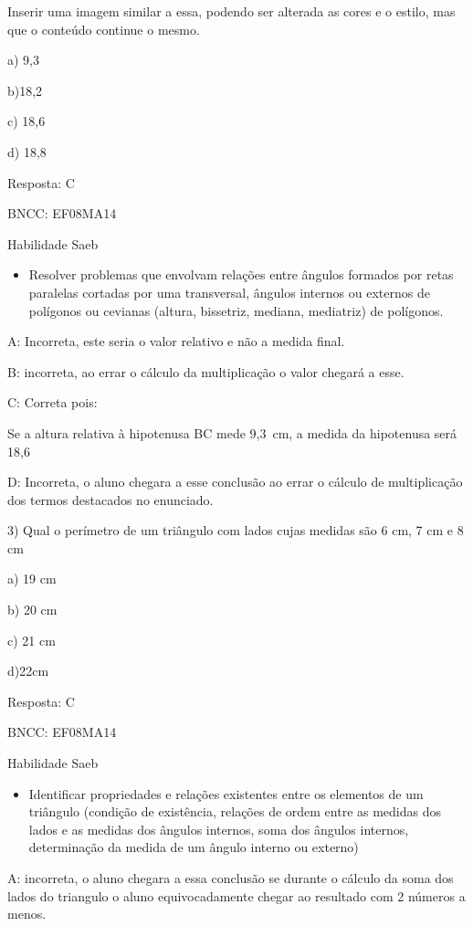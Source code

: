 {Inserir uma imagem similar a essa, podendo ser alterada as cores e o
estilo, mas que o conteúdo continue o mesmo.

a) 9,3

b)18,2

c) 18,6

d) 18,8

Resposta: C

BNCC: EF08MA14

Habilidade Saeb

\begin{itemize}
\tightlist
\item
  Resolver problemas que envolvam relações entre ângulos formados por
  retas paralelas cortadas por uma transversal, ângulos internos ou
  externos de polígonos ou cevianas (altura, bissetriz, mediana,
  mediatriz) de polígonos.
\end{itemize}

A: Incorreta, este seria o valor relativo e não a medida final.

B: incorreta, ao errar o cálculo da multiplicação o valor chegará a
esse.

C: Correta pois:

Se a altura relativa à hipotenusa BC mede 9,3~cm, a medida da hipotenusa
será 18,6

D: Incorreta, o aluno chegara a esse conclusão ao errar o cálculo de
multiplicação dos termos destacados no enunciado.

3) Qual o perímetro de um triângulo com lados cujas medidas são 6 cm, 7
cm e 8 cm

a) 19 cm

b) 20 cm

c) 21 cm

d)22cm

Resposta: C

BNCC: EF08MA14

Habilidade Saeb

\begin{itemize}
\tightlist
\item
  Identificar propriedades e relações existentes entre os elementos de
  um triângulo (condição de existência, relações de ordem entre as
  medidas dos lados e as medidas dos ângulos internos, soma dos ângulos
  internos, determinação da medida de um ângulo interno ou externo)
\end{itemize}

A: incorreta, o aluno chegara a essa conclusão se durante o cálculo da
soma dos lados do triangulo o aluno equivocadamente chegar ao resultado
com 2 números a menos.

}
